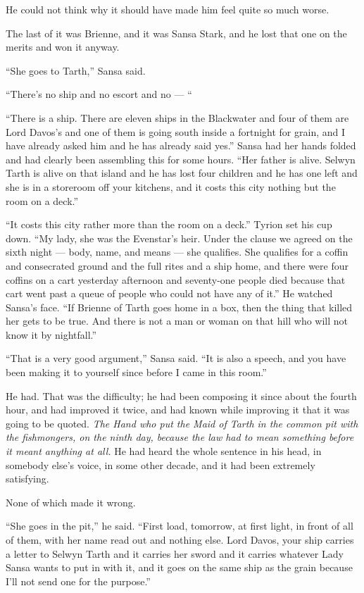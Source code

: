 He could not think why it should have made him feel quite so much worse.

\sceneBreak

The last of it was Brienne, and it was Sansa Stark, and he lost that one on the merits and won it anyway.

“She goes to Tarth,” Sansa said.

“There’s no ship and no escort and no — “

“There is a ship. There are eleven ships in the Blackwater and four of them are Lord Davos’s and one of them is going south inside a fortnight for grain, and I have already asked him and he has already said yes.” Sansa had her hands folded and had clearly been assembling this for some hours. “Her father is alive. Selwyn Tarth is alive on that island and he has lost four children and he has one left and she is in a storeroom off your kitchens, and it costs this city nothing but the room on a deck.”

“It costs this city rather more than the room on a deck.” Tyrion set his cup down. “My lady, she was the Evenstar’s heir. Under the clause we agreed on the sixth night — body, name, and means — she qualifies. She qualifies for a coffin and consecrated ground and the full rites and a ship home, and there were four coffins on a cart yesterday afternoon and seventy-one people died because that cart went past a queue of people who could not have any of it.” He watched Sansa’s face. “If Brienne of Tarth goes home in a box, then the thing that killed her gets to be true. And there is not a man or woman on that hill who will not know it by nightfall.”

“That is a very good argument,” Sansa said. “It is also a speech, and you have been making it to yourself since before I came in this room.”

He had. That was the difficulty; he had been composing it since about the fourth hour, and had improved it twice, and had known while improving it that it was going to be quoted. \textit{The Hand who put the Maid of Tarth in the common pit with the fishmongers, on the ninth day, because the law had to mean something before it meant anything at all.} He had heard the whole sentence in his head, in somebody else’s voice, in some other decade, and it had been extremely satisfying.

None of which made it wrong.

“She goes in the pit,” he said. “First load, tomorrow, at first light, in front of all of them, with her name read out and nothing else. Lord Davos, your ship carries a letter to Selwyn Tarth and it carries her sword and it carries whatever Lady Sansa wants to put in with it, and it goes on the same ship as the grain because I’ll not send one for the purpose.”

